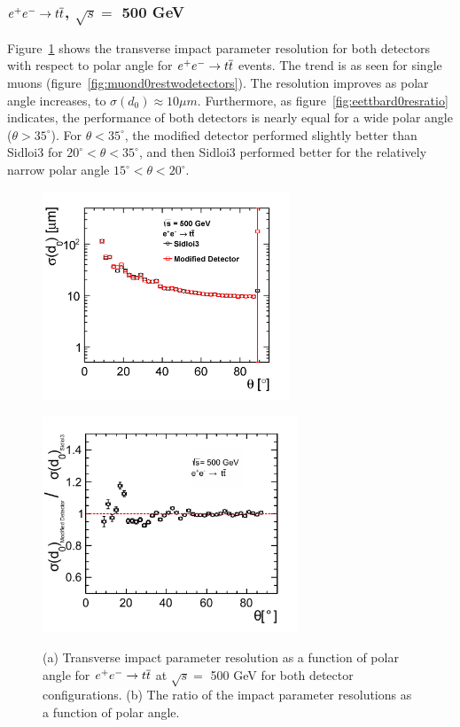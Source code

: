 \subsubsection{$\ee \rightarrow \ttbar$, $ \sqrt{s} = $ 500 GeV}
Figure~\ref{fig:eettbard0res} shows the transverse impact parameter resolution for both detectors
with respect to polar angle for $\ee \rightarrow \ttbar$ events.%
The trend  is as seen for single muons (figure~\ref{fig:muond0restwodetectors}).
The resolution improves as polar angle increases, to $\sigma(d_{0}) \approx 10 \mu m$.
Furthermore, as figure~\ref{fig:eettbard0resratio} indicates, the performance
of both detectors is nearly equal for a wide polar angle ($\theta > 35^{\circ}$).
For $\theta < 35^{\circ}$, the modified detector performed slightly better than Sidloi3 for $20^{\circ} < \theta < 35^{\circ}$,
and then Sidloi3 performed better for the relatively narrow polar angle $15^{\circ} < \theta < 20^{\circ}$.
\begin{figure}[h!]
\begin{minipage}{3.0in}
\centering
\includegraphics[width=2.9in]{eettbarD0ResolutionTheta_sidloi3_det_vtxbar_3doublet.png}
\label{fig:eettbard0restwodetectors}
\end{minipage}
\begin{minipage}{3.0in}
\centering
\includegraphics[width=3.0in]{eettbarD0ResolutionThetaRatio2.pdf}
\label{fig:eettbard0resratio}
\end{minipage}
\caption{(a) Transverse impact parameter resolution as a function of polar angle for
$\ee \rightarrow \ttbar$  at $\sqrt{s} = $ 500 GeV for both detector configurations.
(b) The ratio of the impact parameter resolutions as a function of polar angle.}
\label{fig:eettbard0res}
\end{figure}
